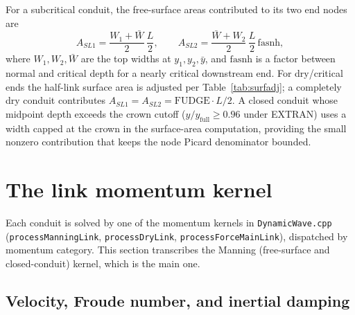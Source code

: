 \documentclass[11pt,a4paper]{article}
\begin{document}
For a subcritical conduit, the free-surface areas contributed to its two end
nodes are
\begin{equation}
  A_{SL1} = \frac{W_1 + \bar{W}}{2}\,\frac{L}{2},
  \qquad
  A_{SL2} = \frac{\bar{W} + W_2}{2}\,\frac{L}{2}\,
  \mathrm{fasnh},
\end{equation}
where $W_1, W_2, \bar W$ are the top widths at $y_1, y_2, \bar y$, and
$\mathrm{fasnh}$ is a factor between normal and critical depth for a nearly
critical downstream end. For dry/critical ends the half-link surface area is
adjusted per Table~\ref{tab:surfadj}; a completely dry conduit contributes
$A_{SL1} = A_{SL2} = \mathrm{FUDGE}\cdot L/2$. A closed conduit whose midpoint
depth exceeds the crown cutoff ($y/y_{\mathrm{full}} \ge 0.96$ under EXTRAN)
uses a width capped at the crown in the surface-area computation, providing the
small nonzero contribution that keeps the node Picard denominator bounded.

\section{The link momentum kernel}
\label{sec:momentum-kernel}

Each conduit is solved by one of the momentum kernels in
\texttt{DynamicWave.cpp} (\texttt{process\-Manning\-Link},
\texttt{process\-Dry\-Link}, \texttt{process\-Force\-Main\-Link}), dispatched
by momentum category. This section transcribes the Manning (free-surface and
closed-conduit) kernel, which is the main one.

\subsection{Velocity, Froude number, and inertial damping}
\end{document}
